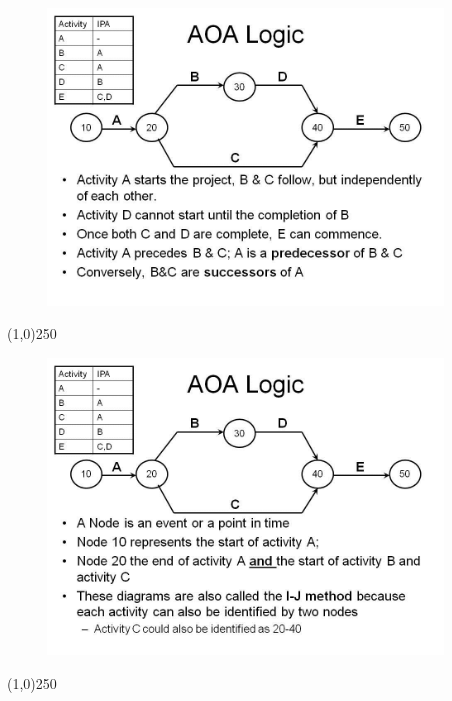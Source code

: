\begin{frame}
\begin{figure}
	\centering
		\includegraphics[width = 10.5cm]{oldnotes/Slide48.jpg}
\end{figure}
\end{frame}
\begin{center}\line(1,0){250}\end{center}





\begin{frame}
\begin{figure}
	\centering
		\includegraphics[width = 10.5cm]{oldnotes/Slide49.jpg}
\end{figure}
\end{frame}
\begin{center}\line(1,0){250}\end{center}





